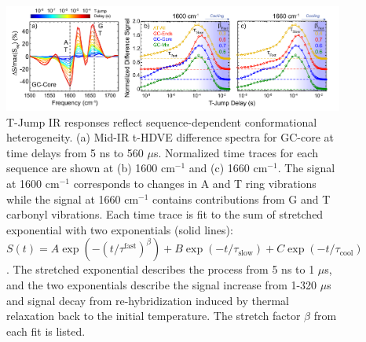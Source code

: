 \documentclass[journal=jpcbfk,manuscript=article]{achemso}
\begin{document}
\begin{figure}[ht!] %
	\begin{center} 
        \includegraphics[width=175mm, scale=1]{Fig5.pdf}
        \caption{T-Jump IR responses reflect sequence-dependent conformational heterogeneity. (a) Mid-IR t-HDVE difference spectra for GC-core at time delays from 5 ns to 560 $\mu$s. Normalized time traces for each sequence are shown at (b) 1600 cm$^{-1}$ and (c) 1660 cm$^{-1}$. The signal at 1600 cm$^{-1}$ corresponds to changes in A and T ring vibrations while the signal at 1660 cm$^{-1}$ contains contributions from G and T carbonyl vibrations. Each time trace is fit to the sum of stretched exponential with two exponentials (solid lines): $S(t) = A\exp{(-(t/\tau^{\mathrm{fast}})^{\beta})} + B\exp{(-t/\tau_{\mathrm{slow}})}+C\exp{(-t/\tau_{\mathrm{cool}})}$. The stretched exponential describes the process from 5 ns to 1 $\mu$s, and the two exponentials describe the signal increase from 1-320 $\mu$s and signal decay from re-hybridization induced by thermal relaxation back to the initial temperature. The stretch factor $\beta$ from each fit is listed.}

        \label{fig:T-jump_stretching}
	\end{center}
\end{figure}

   
   
   

\end{document}
